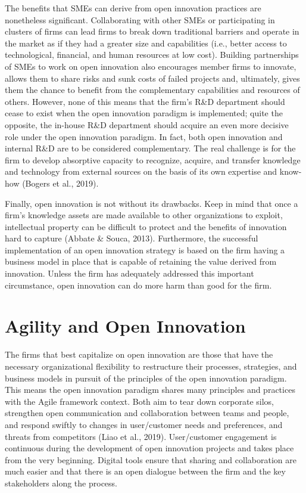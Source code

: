 \documentclass[
  letterpaper,
  DIV=11,
  numbers=noendperiod]{scrreprt}
\begin{document}
The benefits that SMEs can derive from open innovation practices are
nonetheless significant. Collaborating with other SMEs or participating
in clusters of firms can lead firms to break down traditional barriers
and operate in the market as if they had a greater size and capabilities
(i.e., better access to technological, financial, and human resources at
low cost). Building partnerships of SMEs to work on open innovation also
encourages member firms to innovate, allows them to share risks and sunk
costs of failed projects and, ultimately, gives them the chance to
benefit from the complementary capabilities and resources of others.
However, none of this means that the firm's R\&D department should cease
to exist when the open innovation paradigm is implemented; quite the
opposite, the in-house R\&D department should acquire an even more
decisive role under the open innovation paradigm. In fact, both open
innovation and internal R\&D are to be considered complementary. The
real challenge is for the firm to develop absorptive capacity to
recognize, acquire, and transfer knowledge and technology from external
sources on the basis of its own expertise and know-how (Bogers et al.,
2019).

Finally, open innovation is not without its drawbacks. Keep in mind that
once a firm's knowledge assets are made available to other organizations
to exploit, intellectual property can be difficult to protect and the
benefits of innovation hard to capture (Abbate \& Souca, 2013).
Furthermore, the successful implementation of an open innovation
strategy is based on the firm having a business model in place that is
capable of retaining the value derived from innovation. Unless the firm
has adequately addressed this important circumstance, open innovation
can do more harm than good for the firm.

\hypertarget{agility-and-open-innovation}{%
\section{Agility and Open
Innovation}\label{agility-and-open-innovation}}

The firms that best capitalize on open innovation are those that have
the necessary organizational flexibility to restructure their processes,
strategies, and business models in pursuit of the principles of the open
innovation paradigm. This means the open innovation paradigm shares many
principles and practices with the Agile framework context. Both aim to
tear down corporate silos, strengthen open communication and
collaboration between teams and people, and respond swiftly to changes
in user/customer needs and preferences, and threats from competitors
(Liao et al., 2019). User/customer engagement is continuous during the
development of open innovation projects and takes place from the very
beginning. Digital tools ensure that sharing and collaboration are much
easier and that there is an open dialogue between the firm and the key
stakeholders along the process.
\end{document}
